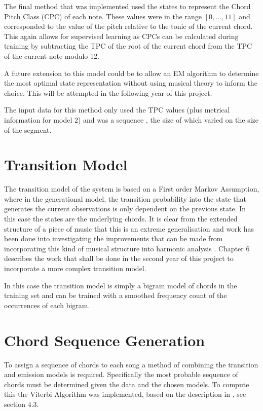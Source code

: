 \documentclass[bsc,singlespacing,parskip,deptreport,twoside,frontabs]{infthesis}
\begin{document}
The final method that was implemented used the states to represent the Chord Pitch Class (CPC) of each note. These values were in the range $[0,...,11]$ and corresponded to the value of the pitch relative to the tonic of the current chord. This again allows for supervised learning as CPCs can be calculated during training by subtracting the TPC of the root of the current chord from the TPC of the current note modulo 12.

A future extension to this model could be to allow an EM algorithm to determine the most optimal state representation without using musical theory to inform the choice. This will be attempted in the following year of this project.

The input data for this method only used the TPC values (plus metrical information for model 2) and was a sequence , the size of which varied on the size of the segment.

\section{Transition Model}

The transition model of the system is based on a First order Markov Assumption, where in the generational model, the transition probability into the state that generates the current observations is only dependent on the previous state. In this case the states are the underlying chords. It is clear from the extended structure of a piece of music that this is an extreme generalisation and work has been done into investigating the improvements that can be made from incorporating this kind of musical structure into harmonic analysis \cite[]{struct}. Chapter 6 describes the work that shall be done in the second year of this project to incorporate a more complex transition model.

In this case the transition model is simply a bigram model of chords in the training set and can be trained with a smoothed frequency count of the occurrences of each bigram.

\section{Chord Sequence Generation}

To assign a sequence of chords to each song a method of combining the transition and emission models is required. Specifically the most probable sequence of chords must be determined given the data and the chosen models. To compute this the Viterbi Algorithm was implemented, based on the description in \cite{jur}, see section 4.3.
\end{document}
